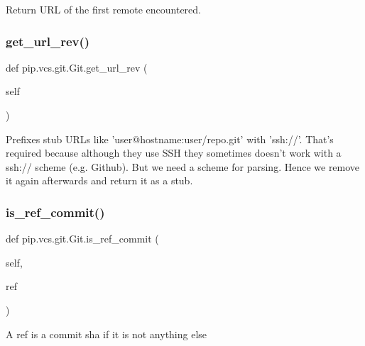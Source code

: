 \begin{DoxyVerb}Return URL of the first remote encountered.\end{DoxyVerb}
 \mbox{\label{classpip_1_1vcs_1_1git_1_1_git_a4bef8c67067f75d14376fb2208b1076d}} 
\subsubsection{\texorpdfstring{get\+\_\+url\+\_\+rev()}{get\_url\_rev()}}
{\footnotesize\ttfamily def pip.\+vcs.\+git.\+Git.\+get\+\_\+url\+\_\+rev (\begin{DoxyParamCaption}\item[{}]{self }\end{DoxyParamCaption})}

\begin{DoxyVerb}Prefixes stub URLs like 'user@hostname:user/repo.git' with 'ssh://'.
That's required because although they use SSH they sometimes doesn't
work with a ssh:// scheme (e.g. Github). But we need a scheme for
parsing. Hence we remove it again afterwards and return it as a stub.
\end{DoxyVerb}
 \mbox{\label{classpip_1_1vcs_1_1git_1_1_git_a608b7df61ed6b95a42e6989777e981ca}} 
\subsubsection{\texorpdfstring{is\+\_\+ref\+\_\+commit()}{is\_ref\_commit()}}
{\footnotesize\ttfamily def pip.\+vcs.\+git.\+Git.\+is\+\_\+ref\+\_\+commit (\begin{DoxyParamCaption}\item[{}]{self,  }\item[{}]{ref }\end{DoxyParamCaption})}

\begin{DoxyVerb}A ref is a commit sha if it is not anything else\end{DoxyVerb}
 

